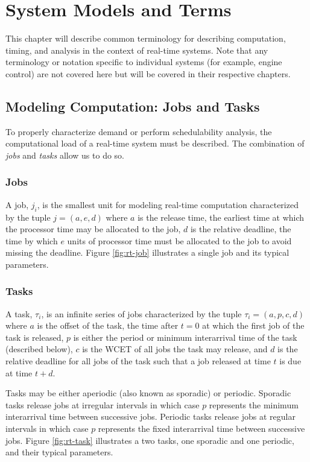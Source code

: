 \section{System Models and Terms}   \label{chap:systemModel}

This chapter will describe common terminology for describing computation, timing, and analysis in the context of real-time systems.
Note that any terminology or notation specific to individual systems (for example, engine control) are not covered here but will be covered in their respective chapters.

\subsection{Modeling Computation: Jobs and Tasks}

To properly characterize demand or perform schedulability analysis, the computational load of a real-time system must be described.
The combination of \textit{jobs} and \textit{tasks} allow us to do so.

\subsubsection{Jobs}

A job, $j_i$, is the smallest unit for modeling real-time computation characterized by the tuple $j = (a,e,d)$ where $a$ is the release time, the earliest time at which the processor time may be allocated to the job, $d$ is the relative deadline, the time by which $e$ units of processor time must be allocated to the job to avoid missing the deadline.
Figure \ref{fig:rt-job} illustrates a single job and its typical parameters.

\subsubsection{Tasks}

A task, $\tau_i$, is an infinite series of jobs characterized by the tuple $\tau_i = (a,p,c,d)$ where $a$ is the offset of the task, the time after $t=0$ at which the first job of the task is released, $p$ is either the period or minimum interarrival time of the task (described below), $c$ is the WCET of all jobs the task may release, and $d$ is the relative deadline for all jobs of the task such that a job released at time $t$ is due at time $t+d$.

Tasks may be either aperiodic (also known as sporadic) or periodic.
Sporadic tasks release jobs at irregular intervals in which case $p$ represents the minimum interarrival time between successive jobs.
Periodic tasks release jobs at regular intervals in which case $p$ represents the fixed interarrival time between successive jobs.
Figure \ref{fig:rt-task} illustrates a two tasks, one sporadic and one periodic, and their typical parameters.

